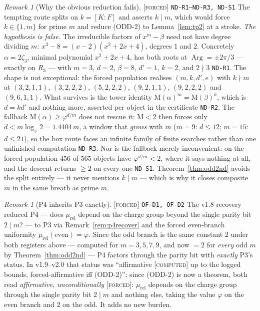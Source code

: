 \documentclass[11pt]{article}
\newcommand{\tagF}{\textcolor{cF}{\textsc{[forced]}}}
\newcommand{\tagC}{\textcolor{cC}{\textsc{[computed]}}}
\newcommand{\hx}[1]{\textcolor{cC}{\footnotesize\texttt{#1}}}
\newcommand{\gp}{\varphi}
\newcommand{\M}{\mathrm{M}}
\DeclareMathOperator{\Arg}{Arg}
\theoremstyle{plain}
\theoremstyle{definition}
\theoremstyle{remark}
\newtheorem{remark}[theorem]{Remark}
\begin{document}
\begin{remark}[Why the obvious reduction fails]\label{rem:r1dead}\tagF{} \hx{ND-R1--ND-R3, ND-S1}
The tempting route splits on $k=[K:F]$ and asserts $k\mid m$, which would force
$k\in\{1,m\}$ for prime $m$ and reduce (ODD-2) to Lemma~\ref{lem:tp2} at a
stroke. \emph{The hypothesis is false.} The irreducible factors of $x^m-\beta$
need not have degree dividing $m$: $x^3-8=(x-2)(x^2+2x+4)$, degrees $1$ and $2$.
Concretely $\alpha=2\zeta_3$, minimal polynomial $x^2+2x+4$, has both roots at
$\Arg=\pm2\pi/3$ --- exactly on $R_3$ --- with $m=3$, $d=2$, $\beta=8$, $d'=1$,
$k=2$, and $2\nmid3$ \hx{ND-R1}. The shape is not exceptional: the forced
population realises $(m,k,d',e)$ with $k\nmid m$ at
$(3,2,1,1)$, $(3,2,2,2)$, $(5,2,2,2)$, $(9,2,1,1)$, $(9,2,2,2)$ and $(9,6,1,1)$.
What survives is the tower identity $\M(\alpha)^m=\M(\beta)^k$, which is $d=kd'$
and nothing more, asserted per object in the certificate \hx{ND-R2}. The
fallback $\M(\alpha)\ge\gp^{d/m}$ does not rescue it: $\M<2$ then forces only
$d<m\log_\gp2=1.4404\,m$, a window that \emph{grows} with $m$ ($m=9$: $d\le12$;
$m=15$: $d\le21$), so the box route faces an infinite family of finite searches
rather than one unfinished computation \hx{ND-R3}. Nor is the fallback merely
inconvenient: on the forced population $456$ of $565$ objects have
$\gp^{d/m}<2$, where it says nothing at all, and the descent returns $\ge2$ on
every one \hx{ND-S1}. Theorem~\ref{thm:odd2nd} avoids the split entirely --- it
never mentions $k\mid m$ --- which is why it closes composite $m$ in the same
breath as prime $m$.
\end{remark}

\begin{remark}[P4 inherits P3 exactly]\label{rem:p4transfer}\tagF{} \hx{OF-D1, OF-D2}
The v1.8 recovery reduced P4 --- does $\mu_{\mathrm{rel}}$ depend on the charge
group beyond the single parity bit $2\mid m$? --- to P3 via
Remark~\ref{rem:p4recover} and the forced even-branch uniformity
$\mu_{\mathrm{rel}}(\text{even})=\gp$. Since the odd branch is the same constant
$2$ under both registers above --- computed for $m=3,5,7,9$, and now $=2$ for
\emph{every} odd $m$ by Theorem~\ref{thm:odd2nd} --- P4 factors through the parity
bit with \emph{exactly} P3's status. In v1.9--v2.0 that status was
``affirmative \tagC{} up to the logged bounds, forced-affirmative iff (ODD-2)'';
since (ODD-2) is now a theorem, both read \emph{affirmative,
unconditionally} \tagF{}: $\mu_{\mathrm{rel}}$ depends on the charge group
through the single parity bit $2\mid m$ and nothing else, taking the value $\gp$
on the even branch and $2$ on the odd. It adds no new burden.
\end{remark}
\end{document}
